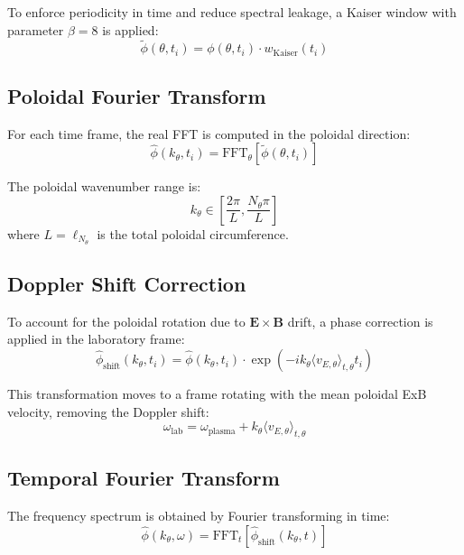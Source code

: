 \documentclass[11pt,a4paper]{article}
\begin{document}
To enforce periodicity in time and reduce spectral leakage, a Kaiser window with parameter $\beta = 8$ is applied:
\begin{equation}
\tilde{\phi}(\theta, t_i) = \phi(\theta, t_i) \cdot w_{\text{Kaiser}}(t_i)
\end{equation}

\subsection{Poloidal Fourier Transform}

For each time frame, the real FFT is computed in the poloidal direction:
\begin{equation}
\hat{\phi}(k_\theta, t_i) = \text{FFT}_\theta[\tilde{\phi}(\theta, t_i)]
\end{equation}

The poloidal wavenumber range is:
\begin{equation}
k_\theta \in \left[\frac{2\pi}{L}, \frac{N_\theta \pi}{L}\right]
\end{equation}
where $L = \ell_{N_\theta}$ is the total poloidal circumference.

\subsection{Doppler Shift Correction}

To account for the poloidal rotation due to $\mathbf{E} \times \mathbf{B}$ drift, a phase correction is applied in the laboratory frame:
\begin{equation}
\hat{\phi}_{\text{shift}}(k_\theta, t_i) = \hat{\phi}(k_\theta, t_i) \cdot \exp\left(-i k_\theta \langle v_{E,\theta} \rangle_{t,\theta} t_i\right)
\end{equation}

This transformation moves to a frame rotating with the mean poloidal ExB velocity, removing the Doppler shift:
\begin{equation}
\omega_{\text{lab}} = \omega_{\text{plasma}} + k_\theta \langle v_{E,\theta} \rangle_{t,\theta}
\end{equation}

\subsection{Temporal Fourier Transform}

The frequency spectrum is obtained by Fourier transforming in time:
\begin{equation}
\hat{\phi}(k_\theta, \omega) = \text{FFT}_t[\hat{\phi}_{\text{shift}}(k_\theta, t)]
\end{equation}
\end{document}
